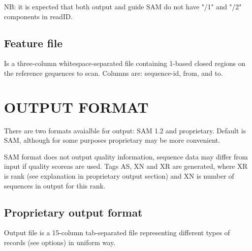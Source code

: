 \documentclass[english]{article}
\begin{document}
    NB: it is expected that both output and guide SAM do not have "/1"
        and "/2" components in readID.

\subsection{Feature file}
    Is a three-column whitespace-separated file containing 1-based closed
    regions on the reference gequences to scan. 
    Columns are: sequence-id, from, and to.

\section{OUTPUT FORMAT}
    There are two formats avaialble for output: SAM 1.2 and 
    proprietary. Default is SAM, although for some purposes proprietary 
    may be more convenient.

    SAM format does not output quality information, sequence data may differ
    from input if quality scoreas are used. Tags AS, XN and XR are generated,
    where XR is rank (see explanation in proprietary output section) and XN is
    number of sequences in output for this rank.

\subsection{Proprietary output format}
    Output file is a 15-column tab-separated file representing different types
    of records (see  options) in uniform way. 
\end{document}
